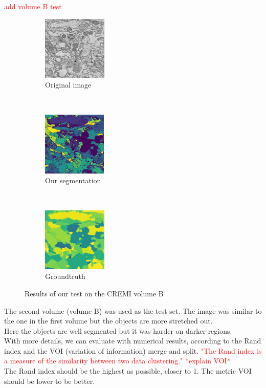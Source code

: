 \textcolor{red}{add volume B test}
\begin{figure}[!htbp]
    \centering
    \begin{subfigure}[t]{0.31\textwidth}
        \centering
        \includegraphics[height=1.2in]{./images/cremi_orig_2.png}
        \caption{Original image}
    \end{subfigure}%
    ~ 
    \begin{subfigure}[t]{0.31\textwidth}
        \centering
        \includegraphics[height=1.2in]{./images/cremi_out_2.png}
        \caption{Our segmentation}
    \end{subfigure}
    ~ 
    \begin{subfigure}[t]{0.31\textwidth}
        \centering
        \includegraphics[height=1.2in]{./images/cremi_gt_2.png}
        \caption{Groundtruth}
    \end{subfigure}
    \caption{Results of our test on the CREMI volume B}
\end{figure}

The second volume (volume B) was used as the test set.
The image was similar to the one in the first volume but the objects are more stretched out.\\
Here the objects are well segmented but it was harder on darker regions.\\

With more details, we can evaluate with numerical results, according to the Rand index and the VOI (variation of information) merge and split. 
\textcolor{red}{"The Rand index is a measure of the similarity between two data clustering."
*explain VOI*\\}
The Rand index should be the highest as possible, closer to 1. 
The metric VOI should be lower to be better.\\

